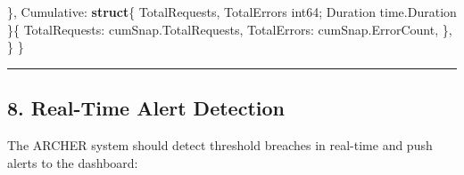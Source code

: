 \documentclass[
]{article}
\newenvironment{Shaded}{}{}
\newcommand{\DataTypeTok}[1]{\textcolor[rgb]{0.56,0.13,0.00}{#1}}
\newcommand{\KeywordTok}[1]{\textcolor[rgb]{0.00,0.44,0.13}{\textbf{#1}}}
\newcommand{\NormalTok}[1]{#1}
\newcommand{\OperatorTok}[1]{\textcolor[rgb]{0.40,0.40,0.40}{#1}}
\begin{document}
\begin{Shaded}
\begin{Highlighting}[]
        \OperatorTok{\},}
\NormalTok{        Cumulative}\OperatorTok{:} \KeywordTok{struct}\OperatorTok{\{}\NormalTok{ TotalRequests}\OperatorTok{,}\NormalTok{ TotalErrors }\DataTypeTok{int64}\OperatorTok{;}\NormalTok{ Duration time}\OperatorTok{.}\NormalTok{Duration }\OperatorTok{\}\{}
\NormalTok{            TotalRequests}\OperatorTok{:}\NormalTok{ cumSnap}\OperatorTok{.}\NormalTok{TotalRequests}\OperatorTok{,}
\NormalTok{            TotalErrors}\OperatorTok{:}\NormalTok{   cumSnap}\OperatorTok{.}\NormalTok{ErrorCount}\OperatorTok{,}
        \OperatorTok{\},}
    \OperatorTok{\}}
\OperatorTok{\}}
\end{Highlighting}
\end{Shaded}

\begin{center}\rule{0.5\linewidth}{0.5pt}\end{center}

\hypertarget{real-time-alert-detection}{%
\subsection{8. Real-Time Alert
Detection}\label{real-time-alert-detection}}

The ARCHER system should detect threshold breaches in real-time and push
alerts to the dashboard:
\end{document}
